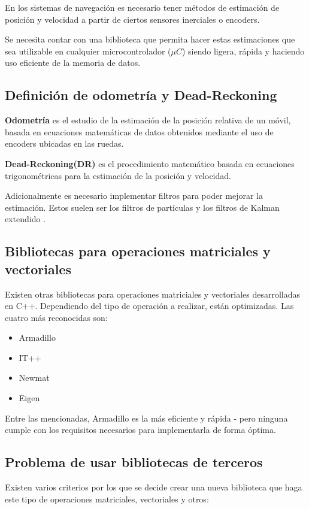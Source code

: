 \documentclass[main.tex]{subfiles}
\begin{document}

En los sistemas de navegación es necesario tener métodos
de estimación de posición y velocidad a partir de ciertos
sensores inerciales o encoders.

Se necesita contar con una biblioteca que permita hacer estas
estimaciones que sea utilizable en cualquier microcontrolador
(${\mu}C$) siendo ligera, rápida y haciendo uso eficiente de la
memoria de datos.

\subsection{Definición de odometría y Dead-Reckoning}
\textbf{Odometría} es el estudio de la estimación de la posición
relativa de un móvil, basada en ecuaciones matemáticas de datos
obtenidos mediante el uso de encoders ubicadas en las ruedas.

\textbf{Dead-Reckoning(DR)} es el procedimiento matemático basada
en ecuaciones trigonométricas para la estimación de la posición
y velocidad.

Adicionalmente es necesario implementar filtros para poder mejorar
la estimación. Estos suelen ser los filtros de partículas y los
filtros de Kalman extendido \cite{DR:kalman_missing}.

\subsection{Bibliotecas para operaciones matriciales y vectoriales}
Existen otras bibliotecas para operaciones matriciales y vectoriales
desarrolladas en C++. Dependiendo del tipo de operación a realizar,
están optimizadas. Las cuatro más reconocidas son:

\begin{itemize}
\item Armadillo
\item IT++
\item Newmat
\item Eigen
\end{itemize}

Entre las mencionadas, Armadillo es la más eficiente y rápida
\cite{LibSpeedweb:Armadillo}-\cite{LibCompare} pero ninguna
cumple con los requisitos necesarios para implementarla de
forma óptima.

\subsection{Problema de usar bibliotecas de terceros}
Existen varios criterios por los que se decide crear una nueva
biblioteca que haga este tipo de operaciones matriciales,
vectoriales y otros:
\end{document}
